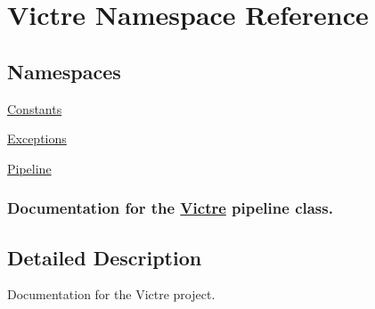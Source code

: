 \hypertarget{namespaceVictre}{\section{Victre Namespace Reference}
\label{namespaceVictre}
}
\subsection*{Namespaces}
\begin{DoxyCompactItemize}
\item 
\hyperlink{namespaceVictre_1_1Constants}{Constants}
\item 
\hyperlink{namespaceVictre_1_1Exceptions}{Exceptions}
\item 
\hyperlink{namespaceVictre_1_1Pipeline}{Pipeline}
\begin{DoxyCompactList}\small\item\em \subsubsection*{Documentation for the \hyperlink{namespaceVictre}{Victre} pipeline class.}\end{DoxyCompactList}\end{DoxyCompactItemize}


\subsection{Detailed Description}
\begin{DoxyVerb}Documentation for the Victre project.
\end{DoxyVerb}
 